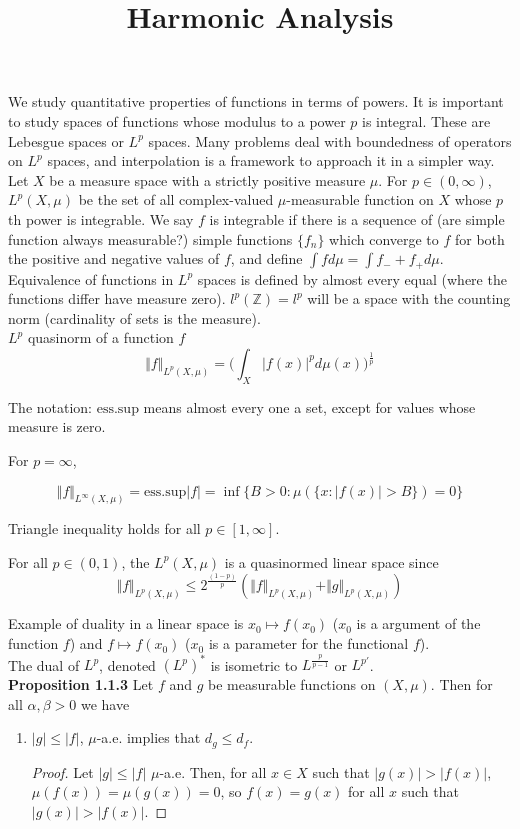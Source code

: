 \documentclass[12pt]{article}
\title{Harmonic Analysis}
\begin{document}
\noindent We study quantitative properties of functions in terms of powers. It is important to study spaces of functions whose modulus to a power $p$ is integral. These are Lebesgue spaces or $L^p$ spaces. Many problems deal with boundedness of operators on $L^p$ spaces, and interpolation is a framework to approach it in a simpler way. \\

\noindent Let $X$ be a measure space with a strictly positive measure $\mu$. For $p \in (0, \infty)$, $L^p(X,\mu)$ be the set of all complex-valued $\mu$-measurable function on $X$ whose $p$th power is integrable. We say $f$ is integrable if there is a sequence of (are simple function always measurable?) simple functions $\{f_n\}$ which converge to $f$ for both the positive and negative values of $f$, and define $\int f d\mu = \int f_- + f_+ d\mu$. Equivalence of functions in $L^p$ spaces is defined by almost every equal (where the functions differ have measure zero). $l^p(\mathbb{Z})=l^p$ will be a space with the counting norm (cardinality of sets is the measure). \\

\noindent $L^p$ quasinorm of a function $f$
$$ \Vert f \Vert_{L^p(X,\mu)} = \Bigg(\int_X \vert f(x)\vert^p d\mu(x)\Bigg)^\frac{1}{p}$$ 

\noindent The notation: $\text{ess.sup}$ means almost every one a set, except for values whose measure is zero. 

For $p = \infty$,

$$ \Vert f \Vert_{L^\infty(X,\mu)} = \text{ess.sup}\vert f \vert = \inf \{B>0 : \mu (\{x:\vert f(x) \vert > B\}) = 0\}$$

Triangle inequality holds for all $p\in [1,\infty]$. 

For all $p \in (0,1)$, the $L^p(X,\mu)$ is a quasinormed linear space since 
$$ \Vert f \Vert_{L^p(X,\mu)} \leq 2^\frac{(1-p)}{p} ( \Vert f \Vert_{L^p(X,\mu)} + \Vert g \Vert_{L^p(X,\mu)})$$

\noindent Example of duality in a linear space is $x_0 \mapsto f(x_0)$ ($x_0$ is a argument of the function $f$) and $f \mapsto f(x_0)$ ($x_0$ is a parameter for the functional $f$). \\

\noindent The dual of $L^p$, denoted $(L^p)^*$ is isometric to $L^\frac{p}{p-1}$ or $L^{p'}$. \\

\noindent \textbf{Proposition 1.1.3} Let $f$ and $g$ be measurable functions on $(X, \mu)$. Then for all $\alpha, \beta > 0$ we have
\begin{enumerate}
\item $\vert g \vert \leq \vert f \vert$, $\mu$-a.e. implies that $d_g \leq d_f$. 
\begin{proof}
Let $\vert g \vert \leq \vert f \vert$ $\mu$-a.e. Then, for all $x \in X$ such that $\vert g(x) \vert > \vert f(x) \vert$, $\mu(f(x))=\mu(g(x)) = 0$, so $f(x)=g(x)$ for all $x$ such that $\vert g(x) \vert > \vert f(x) \vert$.
\end{proof}

\end{enumerate}
\end{document}
